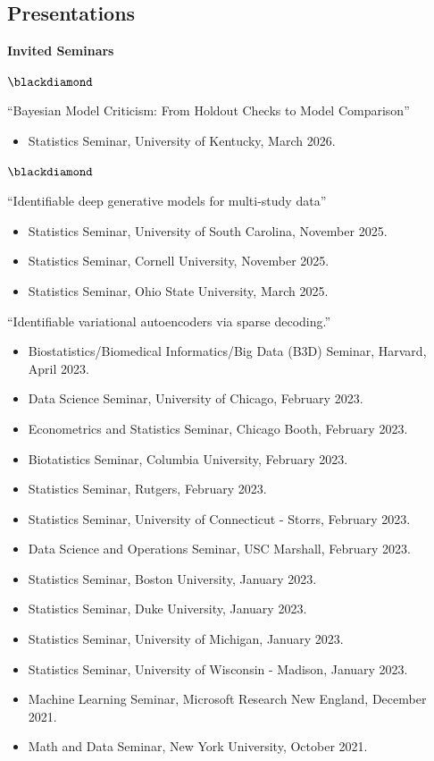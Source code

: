 \documentclass[margin,line]{res}
\newenvironment{list2}{
  \begin{list}{\footnotesize$\blackdiamond$}{%
      \setlength{\itemsep}{8pt}
      \setlength{\parsep}{2pt} \setlength{\parskip}{2pt}
      \setlength{\topsep}{2pt} \setlength{\partopsep}{2pt} 
      \setlength{\leftmargin}{0.2in}
      }}{\end{list}}
\begin{document}
\begin{resume}
\section{\sc Presentations}

{\bf Invited Seminars}

\begin{list2}
\item ``Bayesian Model Criticism: From Holdout Checks to Model Comparison''
\begin{itemize}
  \item Statistics Seminar, University of Kentucky, March 2026.
\end{itemize}
\end{list2}

\begin{list2}
\item ``Identifiable deep generative models for multi-study data''
\begin{itemize}
  \item Statistics Seminar, University of South Carolina, November 2025.
  \item Statistics Seminar, Cornell University, November 2025.
  \item Statistics Seminar, Ohio State University, March 2025.
\end{itemize}
\item ``Identifiable variational autoencoders via sparse decoding.'' 
  \begin{itemize}
    \item Biostatistics/Biomedical Informatics/Big Data (B3D) Seminar, Harvard, April 2023.
    \item Data Science Seminar, University of Chicago, February 2023.
    \item Econometrics and Statistics Seminar, Chicago Booth, February 2023.
    \item Biotatistics Seminar, Columbia University, February 2023.
    \item Statistics Seminar, Rutgers, February 2023.
    \item Statistics Seminar, University of Connecticut - Storrs, February 2023.
    \item Data Science and Operations Seminar, USC Marshall, February 2023.
    \item Statistics Seminar, Boston University, January 2023.
    \item Statistics Seminar, Duke University, January 2023.
    \item Statistics Seminar, University of Michigan, January 2023.
    \item Statistics Seminar, University of Wisconsin - Madison, January 2023.
    \item Machine Learning Seminar, Microsoft Research New England, December 2021.
    \item Math and Data Seminar, New York University, October 2021.
  \end{itemize}
\end{list2}


\end{resume}
\end{document}
